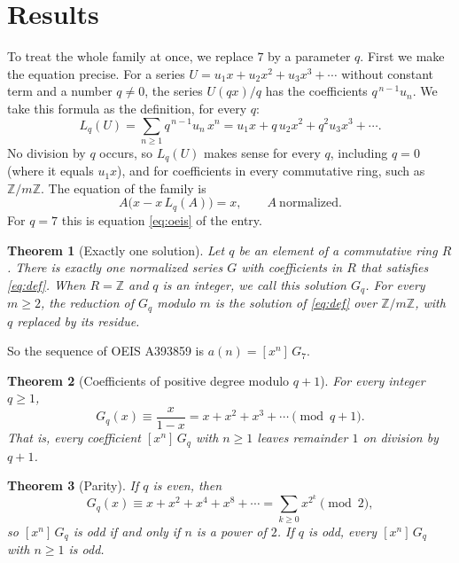 \documentclass[11pt,a4paper]{article}
\newtheorem{theorem}{Theorem}[section]
\theoremstyle{definition}
\theoremstyle{remark}
\newcommand{\Z}{\mathbb{Z}}
\newcommand{\coeff}[2]{[x^{#1}]\,#2}
\begin{document}
\section{Results}\label{sec:results}

To treat the whole family at once, we replace $7$ by a parameter $q$. First we make the equation
precise. For a series $U=u_1x+u_2x^2+u_3x^3+\cdots$ without constant term and a number $q\ne0$, the series $U(qx)/q$
has the coefficients $q^{\,n-1}u_n$. We take this formula as the definition, for every $q$:
\begin{equation}\label{eq:L}
L_q(U)=\sum_{n\ge1}q^{\,n-1}u_n\,x^n=u_1x+q\,u_2x^2+q^2u_3x^3+\cdots .
\end{equation}
No division by $q$ occurs, so $L_q(U)$ makes sense for every $q$, including $q=0$ (where it equals $u_1x$), and for
coefficients in every commutative ring, such as $\Z/m\Z$. The equation of the family is
\begin{equation}\label{eq:def}
A\bigl(x-x\,L_q(A)\bigr)=x,\qquad A\ \text{normalized}.
\end{equation}
For $q=7$ this is equation \eqref{eq:oeis} of the entry.

\begin{theorem}[Exactly one solution]\label{thm:exist}
Let $q$ be an element of a commutative ring $R$. There is exactly one normalized series $G$ with coefficients in $R$
that satisfies \eqref{eq:def}. When $R=\Z$ and $q$ is an integer, we call this solution $G_q$. For every $m\ge2$, the
reduction of $G_q$ modulo $m$ is the solution of \eqref{eq:def} over $\Z/m\Z$, with $q$ replaced by its residue.
\end{theorem}

So the sequence of OEIS A393859 is $a(n)=\coeff{n}{G_{7}}$.

\begin{theorem}[Coefficients of positive degree modulo $q+1$]\label{thm:mod}
For every integer $q\ge1$,
\[
G_q(x)\equiv\frac{x}{1-x}=x+x^2+x^3+\cdots\pmod{q+1}.
\]
That is, every coefficient $\coeff{n}{G_q}$ with $n\ge1$ leaves remainder $1$ on division by $q+1$.
\end{theorem}

\begin{theorem}[Parity]\label{thm:parity}
If $q$ is even, then
\[
G_q(x)\equiv x+x^2+x^4+x^8+\cdots=\sum_{k\ge0}x^{2^k}\pmod 2,
\]
so $\coeff{n}{G_q}$ is odd if and only if $n$ is a power of $2$. If $q$ is odd, every $\coeff{n}{G_q}$ with $n\ge1$
is odd.
\end{theorem}
\end{document}
